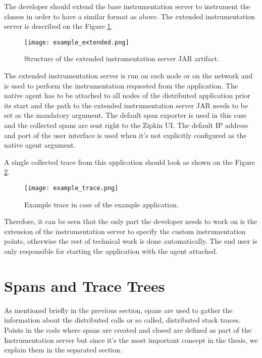 The developer should extend the base instrumentation server to instrument the classes in order to have a similar format as above. The extended instrumentation server is described on the Figure \ref{fig:example_extended}.

	\begin{figure}
		\centering
		\texttt{[image: example\_extended.png]}
		\caption{Structure of the extended instrumentation server JAR artifact.}
		\label{fig:example_extended}
	\end{figure}

The extended instrumentation server is run on each node or on the network and is used to perform the instrumentation requested from the application. The native agent has to be attached to all nodes of the distributed application prior its start and the path to the extended instrumentation server JAR needs to be set as the mandatory argument. The default span exporter is used in this case and the collected spans are sent right to the Zipkin UI. The default IP address and port of the user interface is used when it's not explicitly configured as the native agent argument.

A single collected trace from this application should look as shown on the Figure \ref{fig:example_trace}.

	\begin{figure}
		\centering
		\texttt{[image: example\_trace.png]}
		\caption{Example trace in case of the example application.}
		\label{fig:example_trace}
	\end{figure}

Therefore, it can be seen that the only part the developer needs to work on is the extension of the instrumentation server to specify the custom instrumentation points, otherwise the rest of technical work is done automatically. The end user is only responsible for starting the application with the agent attached.

\section{Spans and Trace Trees}
\label{subsec:spans}
As mentioned briefly in the previous section, spans are used to gather the information about the distributed calls or so called, distributed stack traces. Points in the code where spans are created and closed are defined as part of the Instrumentation server but since it's the most important concept in the thesis, we explain them in the separated section. 

